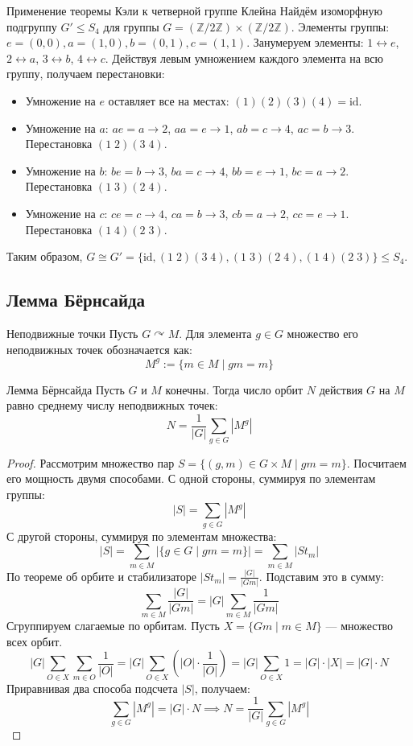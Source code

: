 \begin{Example}{Применение теоремы Кэли к четверной группе Клейна}{}
	Найдём изоморфную подгруппу $G' \le S_4$ для группы $G = (\mathbb{Z}/2\mathbb{Z}) \times (\mathbb{Z}/2\mathbb{Z})$.
	Элементы группы: $e=(0,0), a=(1,0), b=(0,1), c=(1,1)$.
	Занумеруем элементы: $1 \leftrightarrow e$, $2 \leftrightarrow a$, $3 \leftrightarrow b$, $4 \leftrightarrow c$.
	Действуя левым умножением каждого элемента на всю группу, получаем перестановки:
	\begin{itemize}
		\item Умножение на $e$ оставляет все на местах: $(1)(2)(3)(4) = \text{id}$.
		\item Умножение на $a$: $ae=a \to 2$, $aa=e \to 1$, $ab=c \to 4$, $ac=b \to 3$. Перестановка $(1\;2)(3\;4)$.
		\item Умножение на $b$: $be=b \to 3$, $ba=c \to 4$, $bb=e \to 1$, $bc=a \to 2$. Перестановка $(1\;3)(2\;4)$.
		\item Умножение на $c$: $ce=c \to 4$, $ca=b \to 3$, $cb=a \to 2$, $cc=e \to 1$. Перестановка $(1\;4)(2\;3)$.
	\end{itemize}
	Таким образом, $G \cong G' = \{\text{id}, (1\;2)(3\;4), (1\;3)(2\;4), (1\;4)(2\;3)\} \le S_4$.
\end{Example}

\subsection{Лемма Бёрнсайда}

\begin{Definition}{Неподвижные точки}{}
	Пусть $G \curvearrowright M$. Для элемента $g \in G$ множество его неподвижных точек обозначается как:
	\[ M^g := \{m \in M \mid gm = m\} \]
\end{Definition}

\begin{Lemma}{Лемма Бёрнсайда}{}
	Пусть $G$ и $M$ конечны. Тогда число орбит $N$ действия $G$ на $M$ равно среднему числу неподвижных точек:
	\[ N = \frac{1}{|G|} \sum_{g \in G} |M^g| \]
\end{Lemma}

\begin{proof}
	Рассмотрим множество пар $S = \{(g, m) \in G \times M \mid gm = m\}$. Посчитаем его мощность двумя способами.
	С одной стороны, суммируя по элементам группы:
	\[ |S| = \sum_{g \in G} |M^g| \]
	С другой стороны, суммируя по элементам множества:
	\[ |S| = \sum_{m \in M} |\{g \in G \mid gm = m\}| = \sum_{m \in M} |St_m| \]
	По теореме об орбите и стабилизаторе $|St_m| = \frac{|G|}{|Gm|}$. Подставим это в сумму:
	\[ \sum_{m \in M} \frac{|G|}{|Gm|} = |G| \sum_{m \in M} \frac{1}{|Gm|} \]
	Сгруппируем слагаемые по орбитам. Пусть $X = \{Gm \mid m \in M\}$ — множество всех орбит.
	\[ |G| \sum_{O \in X} \sum_{m \in O} \frac{1}{|O|} = |G| \sum_{O \in X} \left( |O| \cdot \frac{1}{|O|} \right) = |G| \sum_{O \in X} 1 = |G| \cdot |X| = |G| \cdot N \]
	Приравнивая два способа подсчета $|S|$, получаем:
	\[ \sum_{g \in G} |M^g| = |G| \cdot N \implies N = \frac{1}{|G|} \sum_{g \in G} |M^g| \]
\end{proof}

